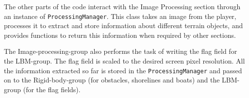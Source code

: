 The other parts of the code interact with the Image Processing section through an instance of \verb|ProcessingManager|. This class takes an image from the player, processes it to extract and store information about different terrain objects, and provides functions to return this information when required by other sections.







The Image-processing-group also performs the task of writing the flag field for the LBM-group. The flag field is scaled to the desired screen pixel resolution. All the information extracted so far is stored in the \verb|ProcessingManager| and passed on to the Rigid-body-group (for obstacles, shorelines and boats) and the LBM-group (for the flag fields).
